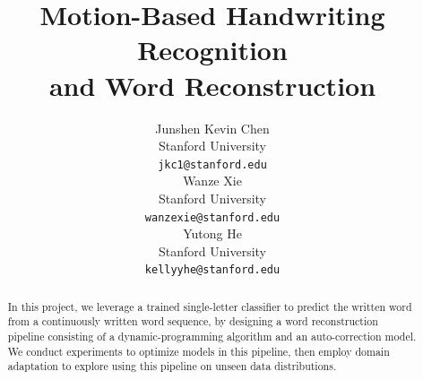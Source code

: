 \documentclass{article}
\title{Motion-Based Handwriting Recognition \\ and Word Reconstruction }
\author{
  Junshen Kevin Chen \\
  Stanford University\\
  \texttt{jkc1@stanford.edu} \\
   \And
  Wanze Xie \\
  Stanford University\\
  \texttt{wanzexie@stanford.edu} \\
    \And
  Yutong He \\
  Stanford University\\
  \texttt{kellyyhe@stanford.edu} \\
}
\begin{document}
\maketitle


\vspace{-5px}

\begin{abstract}
In this project, we leverage a trained single-letter classifier to predict the written word from a continuously written word sequence, by designing a word reconstruction pipeline consisting of a dynamic-programming algorithm and an auto-correction model. We conduct experiments to optimize models in this pipeline, then employ domain adaptation to explore using this pipeline on unseen data distributions.
\end{abstract}
\end{document}
